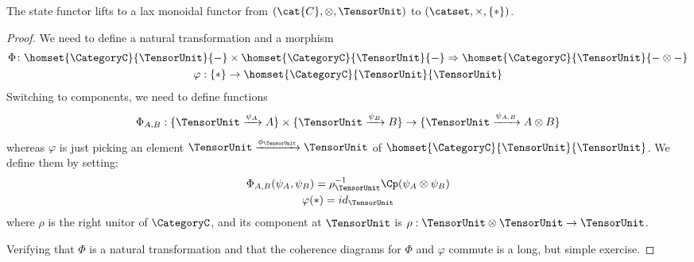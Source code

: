     \begingroup
    \def\theproposition{\ref{prop: state functor lax}}
    \begin{proposition}
        The state functor lifts to a lax monoidal functor from $(\cat{C}, \otimes, \TensorUnit)$ to $(\catset, \times, \{*\})$.
    \end{proposition}
    \addtocounter{proposition}{-1}
    \endgroup
    \begin{proof}
        We need to define a natural transformation and a morphism
        \begin{gather*}
            \Phi\colon \homset{\CategoryC}{\TensorUnit}{-} \times \homset{\CategoryC}{\TensorUnit}{-} \Rightarrow \homset{\CategoryC}{\TensorUnit}{- \otimes -}\\
            \varphi : \{*\} \to \homset{\CategoryC}{\TensorUnit}{\TensorUnit}
        \end{gather*}
        Switching to components, we need to define functions
        \begin{equation*}
            \Phi_{A,B} : \{\TensorUnit \xrightarrow{\psi_A} A \} \times \{\TensorUnit \xrightarrow{\psi_B} B \} \rightarrow 
            \{\TensorUnit \xrightarrow{\psi_{A,B}} A \otimes B \}
        \end{equation*}
        whereas $\varphi$ is just picking an element $\TensorUnit \xrightarrow{\phi_\TensorUnit} \TensorUnit$ of $\homset{\CategoryC}{\TensorUnit}{\TensorUnit}$.
         We define them by setting:
         \begin{gather*}
           \Phi_{A,B}(\psi_{A},\psi_B) = \rho^{-1}_\TensorUnit \Cp  (\psi_A \otimes \psi_B)\\
           \varphi(*) = id_\TensorUnit
         \end{gather*}
        where $\rho$ is the right unitor of $\CategoryC$, and its component at $\TensorUnit$ is $\rho: \TensorUnit \otimes \TensorUnit \to \TensorUnit$.

        Verifying that $\Phi$ is a natural transformation and that the coherence diagrams for $\Phi$ and $\varphi$ commute is a long, but simple exercise.
    \end{proof}


